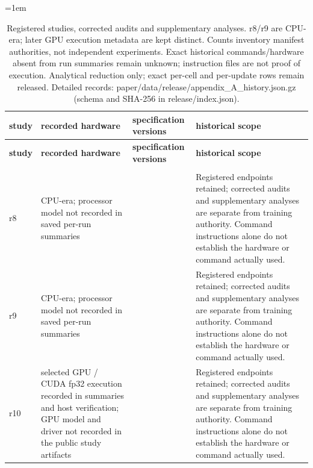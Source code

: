 \begingroup\fontsize{8}{9.5}\selectfont\setlength{\tabcolsep}{3pt}\emergencystretch=1em
\begin{longtable}{@{}>{\raggedright\arraybackslash}p{0.400in}>{\raggedright\arraybackslash}p{2.000in}>{\raggedright\arraybackslash}p{0.700in}>{\raggedright\arraybackslash}p{2.800in}@{}}
\caption{Registered studies, corrected audits and supplementary analyses. r8/\allowbreak{}r9 are CPU-era; later GPU execution metadata are kept distinct. Counts inventory manifest authorities, not independent experiments. Exact historical commands/\allowbreak{}hardware absent from run summaries remain unknown; instruction files are not proof of execution. Analytical reduction only; exact per-cell and per-update rows remain released. Detailed records: paper/\allowbreak{}data/\allowbreak{}release/\allowbreak{}appendix\_\allowbreak{}A\_\allowbreak{}history.json.gz (schema and SHA-256 in release/\allowbreak{}index.json).}\label{tab:appendix_A_history}\\
\toprule
\textbf{study} & \textbf{recorded hardware} & \textbf{specification versions} & \textbf{historical scope} \\
\midrule\endfirsthead
\toprule
\textbf{study} & \textbf{recorded hardware} & \textbf{specification versions} & \textbf{historical scope} \\
\midrule\endhead
\midrule\multicolumn{4}{r}{Continued on next page}\\\endfoot
\bottomrule\endlastfoot
r8 & CPU-era; processor model not recorded in saved per-run summaries & 8 & Registered endpoints retained; corrected audits and supplementary analyses are separate from training authority. Command instructions alone do not establish the hardware or command actually used. \\
r9 & CPU-era; processor model not recorded in saved per-run summaries & 0 & Registered endpoints retained; corrected audits and supplementary analyses are separate from training authority. Command instructions alone do not establish the hardware or command actually used. \\
r10 & selected GPU /\allowbreak{} CUDA fp32 execution recorded in summaries and host verification; GPU model and driver not recorded in the public study artifacts & 13 & Registered endpoints retained; corrected audits and supplementary analyses are separate from training authority. Command instructions alone do not establish the hardware or command actually used. \\

\end{longtable}
